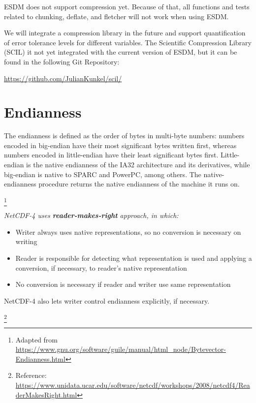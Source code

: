 ESDM does not support compression yet.
Because of that, all functions and tests related to chunking, deflate, and fletcher will not work when using ESDM.

We will integrate a compression library in the future and support quantification of error tolerance levels for different variables.
The Scientific Compression Library (SCIL) it not yet integrated with the current version of ESDM, but it can be found in the following Git Repository:

\begin{center}
\url{https://github.com/JulianKunkel/scil/}
\end{center}

\section{Endianness}

{\itshape

The endianness is defined as the order of bytes in multi-byte numbers: numbers encoded in big-endian have their most significant bytes written first, whereas numbers encoded in little-endian have their least significant bytes first.
Little-endian is the native endianness of the IA32 architecture and its derivatives, while big-endian is native to SPARC and PowerPC, among others.
The native-endianness procedure returns the native endianness of the machine it runs on.
}\footnote{Adapted from \url{https://www.gnu.org/software/guile/manual/html_node/Bytevector-Endianness.html}}

{\itshape
NetCDF-4 uses \textbf{reader-makes-right} approach, in which:

\begin{itemize}

\item Writer always uses native representations, so no conversion is necessary on writing

\item Reader is responsible for detecting what representation is used and applying a conversion, if necessary, to reader's native representation

\item No conversion is necessary if reader and writer use same representation

\end{itemize}

NetCDF-4 also lets writer control endianness explicitly, if necessary.
}\footnote{Reference: \url{https://www.unidata.ucar.edu/software/netcdf/workshops/2008/netcdf4/ReaderMakesRight.html}}


